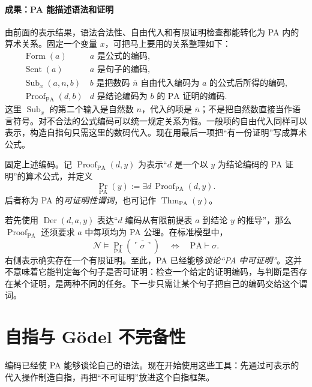 \documentclass[lang=cn,a4paper,fontset=none,zihao=false,10pt,openany,twoside]{beautybook}
\numberwithin{algorithm}{chapter}
\begin{document}
\paragraph{成果：PA 能描述语法和证明}
由前面的表示结果，语法合法性、自由代入和有限证明检查都能转化为 PA 内的算术关系。固定一个变量 $x$，可把马上要用的关系整理如下：
\[
\begin{array}{ll}
\operatorname{Form}(a) & a\text{ 是公式的编码},\\
\operatorname{Sent}(a) & a\text{ 是句子的编码},\\
\operatorname{Sub}_x(a,n,b) & b\text{ 是把数码 }\overline n\text{ 自由代入编码为 }a\text{ 的公式后所得的编码},\\
\operatorname{Proof}_{\mathrm{PA}}(d,b) & d\text{ 是结论编码为 }b\text{ 的 PA 证明的编码}.
\end{array}
\]
这里 $\operatorname{Sub}_x$ 的第二个输入是自然数 $n$，代入的项是 $\overline n$；不是把自然数直接当作语言符号。对不合法的公式编码可以统一规定关系为假。一般项的自由代入同样可以表示，构造自指句只需这里的数码代入。现在用最后一项把“有一份证明”写成算术公式。



\begin{definition}[证明谓词与可证明性谓词]
固定上述编码。记 $\operatorname{Proof}_{\mathrm{PA}}(d,y)$ 为表示“$d$ 是一个以 $y$ 为结论编码的 PA 证明”的算术公式，并定义
\[
 \operatorname{Pr}_{\mathrm{PA}}(y)
 :=\exists d\,\operatorname{Proof}_{\mathrm{PA}}(d,y).
\]
后者称为 PA 的\emph{可证明性谓词}，也可记作 $\operatorname{Thm}_{\mathrm{PA}}(y)$。
\end{definition}
若先使用 $\operatorname{Der}(d,a,y)$ 表达“$d$ 编码从有限前提表 $a$ 到结论 $y$ 的推导”，那么 $\operatorname{Proof}_{\mathrm{PA}}$ 还须要求 $a$ 中每项均为 PA 公理。在标准模型中，
\[
 \mathcal N\models\operatorname{Pr}_{\mathrm{PA}}
 (\overline{\ulcorner\sigma\urcorner})
 \quad\Longleftrightarrow\quad\mathrm{PA}\vdash\sigma.
\]
右侧表示确实存在一个有限证明。至此，PA 已经能够\emph{谈论“PA 中可证明”}。这并不意味着它能判定每个句子是否可证明：检查一个给定的证明编码，与判断是否存在某个证明，是两种不同的任务。下一步只需让某个句子把自己的编码交给这个谓词。

\section{自指与 Gödel 不完备性}\label{sec:incompleteness}
编码已经使 PA 能够谈论自己的语法。现在开始使用这些工具：先通过可表示的代入操作制造自指，再把“不可证明”放进这个自指框架。
\end{document}
